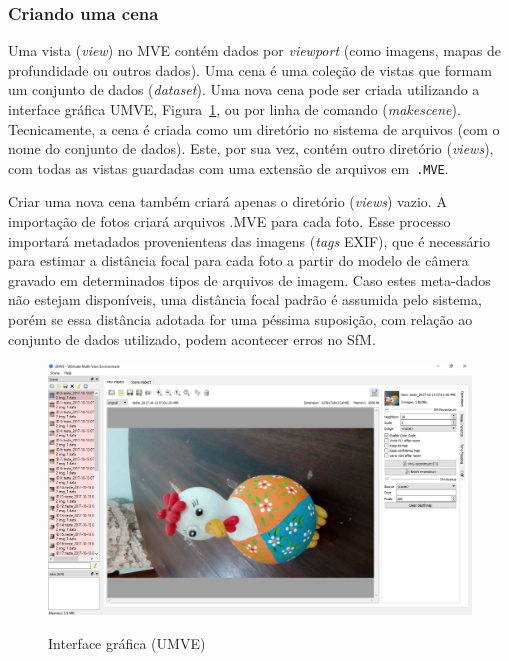 \subsubsection{Criando uma cena}

Uma vista (\emph{view}) no MVE contém dados por \emph{viewport} (como imagens,
mapas de profundidade ou outros dados). Uma cena é uma coleção de vistas que
formam um conjunto de dados (\emph{dataset}). Uma nova cena pode ser criada
utilizando a interface gráfica UMVE, Figura~\ref{fig:umve:gui}, ou por linha de
comando (\emph{makescene}).  Tecnicamente, a cena é criada como um diretório no
sistema de arquivos (com o nome do conjunto de dados). Este, por sua vez, contém
outro diretório (\emph{views}), com todas as vistas guardadas com uma extensão
de arquivos em\ \texttt{.MVE}.

Criar uma nova cena também criará apenas o diretório (\emph{views}) vazio. A
importação de fotos criará arquivos .MVE para cada foto. Esse processo importará
metadados provenienteas das imagens (\emph{tags} EXIF), que é necessário para
estimar a distância focal para cada foto a partir do modelo de câmera gravado em
determinados tipos de arquivos de imagem. Caso estes meta-dados não estejam
disponíveis, uma distância focal padrão é assumida pelo sistema, porém se essa
distância adotada for uma péssima suposição, com relação ao conjunto de dados
utilizado, podem acontecer erros no SfM.

\newpage

\begin{figure}[!h]
	\centering
	\caption{%
	Interface gráfica (UMVE)%
	}
	\includegraphics[width=\linewidth]{figs/umve1.png}
	\label{fig:umve:gui}
\end{figure}
